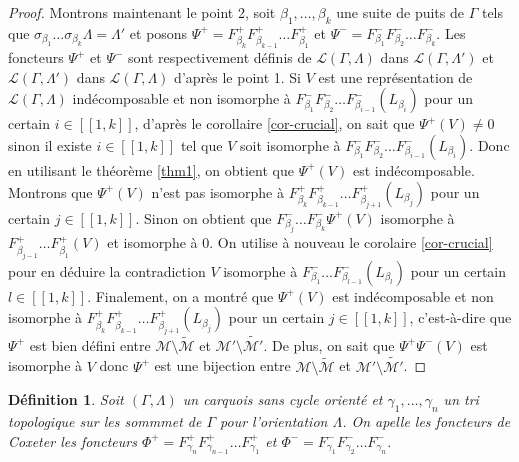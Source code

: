 \documentclass[a4paper,11pt]{article}
\newtheorem{defi}[thm]{Définition}%
\begin{document}
\begin{proof}
Montrons maintenant le point 2, soit $\beta_{1}, \dots, \beta_{k}$ une suite de puits de $\Gamma$ tels que $\sigma_{\beta_{1}}\dots\sigma_{\beta_{k}}\Lambda =  \Lambda'$ et posons $\Psi^{+} = F^{+}_{\beta_{k}}F^{+}_{\beta_{k-1}} \dots F^{+}_{\beta_{1}}$ et $\Psi^{-} = F^{-}_{\beta_{1}}F^{-}_{\beta_{2}} \dots F^{-}_{\beta_{k}}$. Les foncteurs $\Psi^{+}$ et $\Psi^{-}$ sont respectivement définis de $\mathscr L(\Gamma,\Lambda)$ dans $\mathscr L(\Gamma, \Lambda')$ et $\mathscr L(\Gamma,\Lambda')$ dans $\mathscr L(\Gamma, \Lambda)$ d'après le point 1.
Si $V$ est une représentation de $\mathscr L(\Gamma,\Lambda)$ indécomposable et non isomorphe à $F^{-}_{\beta_{1}}F^{-}_{\beta_{2}} \dots F^{-}_{\beta_{i-1}}(L_{\beta_{i}})$ pour un certain $i \in [\![1,k]\!]$, d'après le corollaire \ref{cor-crucial}, on sait que $\Psi^{+}(V) \neq 0$ sinon il existe $i \in [\![1,k]\!]$ tel que $V$ soit isomorphe  à $F^{-}_{\beta_{1}}F^{-}_{\beta_{2}} \dots F^{-}_{\beta_{i-1}}(L_{\beta_{i}})$.
Donc en utilisant le théorème \ref{thm1}, on obtient que $\Psi^{+}(V)$ est indécomposable. Montrons que $\Psi^{+}(V)$ n'est pas isomorphe à $F^{+}_{\beta_{k}}F^{+}_{\beta_{k-1}} \dots F^{+}_{\beta_{j+1}}(L_{\beta_{j}})$ pour un certain $j\in [\![1,k]\!]$. Sinon on obtient que $F^{-}_{\beta_{j}} \dots F^{-}_{\beta_{k}}\Psi^{+}(V)$ isomorphe à $F^{+}_{\beta_{j-1}} \dots F^{+}_{\beta_{1}}(V)$ et isomorphe à $0$. On utilise à nouveau le corolaire \ref{cor-crucial} pour en déduire la contradiction $V$ isomorphe à $F^{-}_{\beta_{1}} \dots F^{-}_{\beta_{l-1}}(L_{\beta_{l}})$ pour un certain $l \in [\![1,k]\!]$. Finalement, on a montré que $\Psi^{+}(V)$ est indécomposable et non isomorphe à $F^{+}_{\beta_{k}}F^{+}_{\beta_{k-1}} \dots F^{+}_{\beta_{j+1}}(L_{\beta_{j}})$ pour un certain $j\in [\![1,k]\!]$, c'est-à-dire que $\Psi^{+}$ est bien défini entre $\mathscr M \setminus \widetilde{\mathscr M}$ et  $\mathscr M' \setminus \widetilde{\mathscr M'}$. De plus, on sait que $\Psi^{+}\Psi^{-}(V)$ est isomorphe à $V$ donc $\Psi^{+}$ est une bijection entre $\mathscr M \setminus \widetilde{\mathscr M}$ et  $\mathscr M' \setminus \widetilde{\mathscr M'}$.
\end{proof}

\begin{defi}
	Soit $(\Gamma,\Lambda)$ un carquois sans cycle orienté et $\gamma_{1}, \dots, \gamma_{n}$ un tri topologique sur les sommmet de $\Gamma$ pour l'orientation $\Lambda$. On apelle les \emph{foncteurs de Coxeter} les foncteurs $\Phi^{+} = F^{+}_{\gamma_{n}}F^{+}_{\gamma_{n-1}} \dots F^{+}_{\gamma_{1}}$ et $\Phi^{-} = F^{-}_{\gamma_{1}}F^{-}_{\gamma_{2}} \dots F^{-}_{\gamma_{n}}$.
\end{defi}
\end{document}
